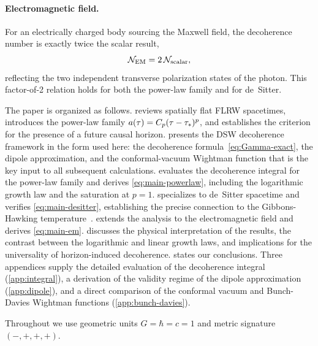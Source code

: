 \paragraph{Electromagnetic field.}
For an electrically charged body sourcing the Maxwell field, the decoherence
number is exactly twice the scalar result,
\begin{equation}
  \mathcal{N}_{\rm EM} = 2\,\mathcal{N}_{\rm scalar} ,
  \label{eq:main-em}
\end{equation}
reflecting the two independent transverse polarization states of the photon.
This factor-of-2 relation holds for both the power-law family and for de~Sitter.

The paper is organized as follows.   reviews spatially flat FLRW
spacetimes, introduces the power-law family $a(\tau) = C_{p}(\tau-\tau_{*})^{p}$,
and establishes the criterion for the presence of a future causal horizon.
 presents the DSW decoherence framework in the form used
here: the decoherence formula~\eqref{eq:Gamma-exact}, the dipole approximation,
and the conformal-vacuum Wightman function that is the key input to all
subsequent calculations.   evaluates the decoherence integral
for the power-law family and derives \cref{eq:main-powerlaw}, including the
logarithmic growth law and the saturation at $p = 1$.  
specializes to de~Sitter spacetime and verifies \cref{eq:main-desitter},
establishing the precise connection to the Gibbons-Hawking
temperature~\cite{Gibbons:1977mu}.   extends the analysis to the
electromagnetic field and derives \cref{eq:main-em}.  
discusses the physical interpretation of the results, the contrast between the
logarithmic and linear growth laws, and implications for the universality of
horizon-induced decoherence.   states our conclusions.
Three appendices supply the detailed evaluation of the decoherence integral
(\cref{app:integral}), a derivation of the validity regime of the dipole
approximation (\cref{app:dipole}), and a direct comparison of the conformal
vacuum and Bunch-Davies Wightman functions (\cref{app:bunch-davies}).

Throughout we use geometric units $G = \hbar = c = 1$ and metric signature
$(-,+,+,+)$.

